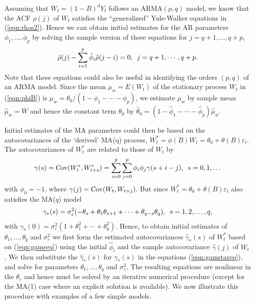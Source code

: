 Assuming that $W_t=(1 - B)^dY_t$ follows an ARMA$(p,q)$ model, we know that the ACF $\rho(j)$ of $W_t$ satisfies the ``generalized'' Yule-Walker equations in (\ref{eqn:rhos2}). Hence we can obtain initial estimates for the AR parameters $\phi_1,\ldots,\phi_p$ by solving the sample version of these equations for $j=q+1,\ldots,q+p$,
	\begin{equation}\label{eqn:rhohatsum}
	\hat{\rho}(j) - \sum_{i=1}^p \hat{\phi}_i \hat{\rho}(j-i) = 0, \enskip j=q+1,\cdots,q+p.
	\end{equation}
Note that these equations could also be useful in identifying the orders $(p,q)$ of an ARMA model. Since the mean $\mu_w = E(W_t)$ of the stationary process $W_t$ in (\ref{eqn:phiB}) is $\mu_w = \theta_0/(1-\phi_1-\cdots-\phi_p)$, we estimate $\mu_w$ by sample mean $\hat{\mu}_w = \overline{W}$ and hence the constant term $\theta_0$ by $\hat{\theta}_0 = (1-\hat{\phi}_1-\cdots-\hat{\phi}_p)\hat{\mu}_w$.


Initial estimates of the MA parameters could then be based on the autocovariances of the `derived' MA(q) process, $W_t^* = \phi(B)W_t = \theta_0 + \theta(B)\varepsilon_t$. The autocovariances of $W_t^*$ are related to those of $W_t$ by
	\begin{equation}\label{eqn:gamseq}
	\gamma(s) = \Cov(W_t^*, W_{t+s}^*) = \sum_{i=0}^p \sum_{j=0}^p \phi_i\phi_j\gamma(s+i-j),\enskip s = 0,1,\ldots
	\end{equation}
with $\phi_0 = -1$, where $\gamma(j) = \operatorname{Cov}(W_t, W_{t+j})$. But since $W_t^* = \theta_0 + \theta(B)\varepsilon_t$ also satisfies the MA($q$) model
	\begin{equation}\label{eqn:gamstareq}
	\gamma_*(s) = \sigma_{\varepsilon}^2(-\theta_s + \theta_1\theta_{s+1} + \cdots + \theta_{q-s}\theta_q),\enskip s = 1,2,\ldots,q,
	\end{equation}
with $\gamma_*(0) = \sigma_{\varepsilon}^2(1 + \theta_1^2 + \cdots + \theta_q^2)$. Hence, to obtain initial estimates of $\theta_1,\ldots,\theta_q$ and $\sigma_{\varepsilon}^2$ we first form the estimated autocovariances $\hat{\gamma}_*(s)$ of $W_t^*$ based on (\ref{eqn:gamseq}) using the initial $\hat{\phi}_{i}$ and the sample autocovariance $\hat{\gamma}(j)$ of $W_t$. We then substitute the $\hat{\gamma}_*(s)$ for $\gamma_*(s)$ in the equations (\ref{eqn:gamstareq}), and solve for parameters $\theta_1,\ldots,\theta_q$ and $\sigma_{\varepsilon}^2$. The resulting equations are nonlinear in the $\theta_i$ and hence must be solved by an iterative numerical procedure (except for the MA(1) case where an explicit solution is available). We now illustrate this procedure with examples of a few simple models. 


